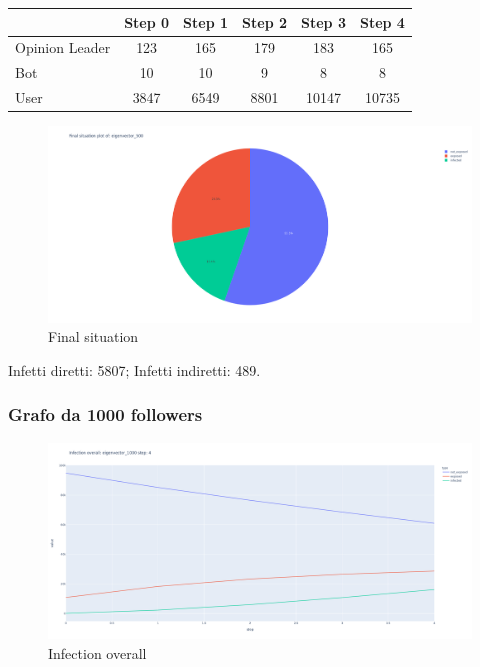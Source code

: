         \begin{table}[H]
            \centering
            \begin{tabular}{|l|c|c|c|c|c|}
            \hline
                           & Step 0 & Step 1 & Step 2 & Step 3 & Step 4 \\ \hline
            Opinion Leader & 123    & 165    & 179    & 183    & 165    \\ \hline
            Bot            & 10     & 10     & 9      & 8      & 8      \\ \hline
            User           & 3847   & 6549   & 8801   & 10147  & 10735  \\ \hline
            \end{tabular}
        \end{table}
        
        \begin{figure}[H]
            \includegraphics[width=16cm]{resources/charts/eig_500_pie.png}
            \caption{Final situation}
            \label{fig:btw_1500_pie}
        \end{figure}
        Infetti diretti: 5807;\newline
        Infetti indiretti: 489.
        
        \subsubsection{Grafo da 1000 followers}
        \begin{figure}[H]
                \includegraphics[width=16cm]{resources/charts/eig_1000_line.png}
                \caption{Infection overall}
                \label{fig:eig_1000_line}
        \end{figure}
        
